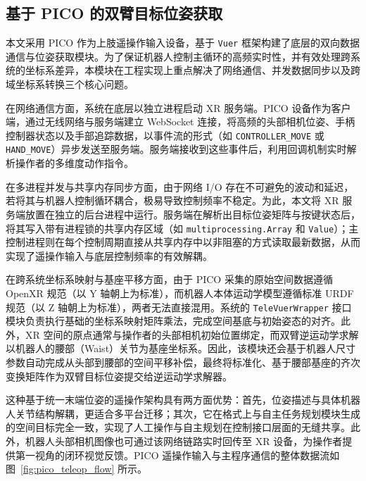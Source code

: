 \subsection{基于 PICO 的双臂目标位姿获取}

本文采用 PICO 作为上肢遥操作输入设备，基于 \texttt{Vuer} 框架构建了底层的双向数据通信与位姿获取模块。为了保证机器人控制主循环的高频实时性，并有效处理跨系统的坐标系差异，本模块在工程实现上重点解决了网络通信、并发数据同步以及跨域坐标系转换三个核心问题。

在网络通信方面，系统在底层以独立进程启动 XR 服务端。PICO 设备作为客户端，通过无线网络与服务端建立 WebSocket 连接，将高频的头部相机位姿、手柄控制器状态以及手部追踪数据，以事件流的形式（如 \texttt{CONTROLLER\_MOVE} 或 \texttt{HAND\_MOVE}）异步发送至服务端。服务端接收到这些事件后，利用回调机制实时解析操作者的多维度动作指令。

在多进程并发与共享内存同步方面，由于网络 I/O 存在不可避免的波动和延迟，若将其与机器人控制循环耦合，极易导致控制频率不稳定。为此，本文将 XR 服务端放置在独立的后台进程中运行。服务端在解析出目标位姿矩阵与按键状态后，将其写入带有进程锁的共享内存区域（如 \texttt{multiprocessing.Array} 和 \texttt{Value}）；主控制进程则在每个控制周期直接从共享内存中以非阻塞的方式读取最新数据，从而实现了遥操作输入与底层控制频率的有效解耦。

在跨系统坐标系映射与基座平移方面，由于 PICO 采集的原始空间数据遵循 OpenXR 规范（以 Y 轴朝上为标准），而机器人本体运动学模型遵循标准 URDF 规范（以 Z 轴朝上为标准），两者无法直接混用。系统的 \texttt{TeleVuerWrapper} 接口模块负责执行基础的坐标系映射矩阵乘法，完成空间基底与初始姿态的对齐。此外，XR 空间的原点通常与操作者的头部相机初始位置绑定，而双臂逆运动学求解以机器人的腰部（Waist）关节为基座坐标系。因此，该模块还会基于机器人尺寸参数自动完成从头部到腰部的空间平移补偿，最终将标准化、基于腰部基座的齐次变换矩阵作为双臂目标位姿提交给逆运动学求解器。

这种基于统一末端位姿的遥操作架构具有两方面优势：首先，位姿描述与具体机器人关节结构解耦，更适合多平台迁移；其次，它在格式上与自主任务规划模块生成的空间目标完全一致，实现了人工操作与自主规划在控制接口层面的无缝共享。此外，机器人头部相机图像也可通过该网络链路实时回传至 XR 设备，为操作者提供第一视角的闭环视觉反馈。PICO 遥操作输入与主程序通信的整体数据流如图~\ref{fig:pico_teleop_flow} 所示。

